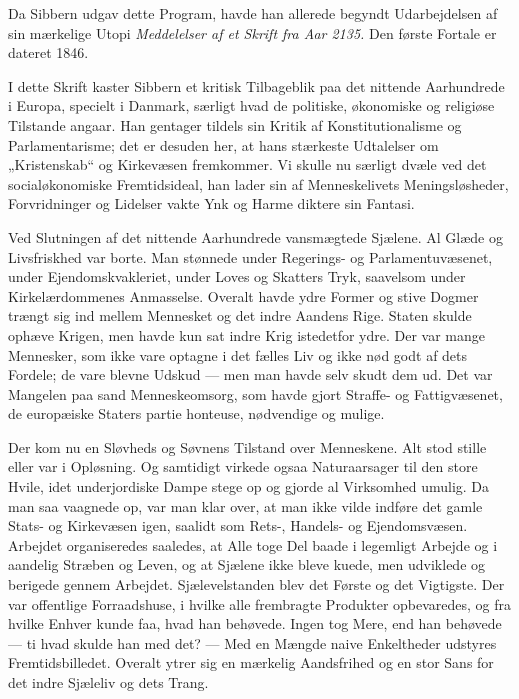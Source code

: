 \documentclass[12pt,a4paper,openany]{book}
\newcommand{\opage}[1]{\marginnote{\footnotesize\textit{[#1]}}}
\begin{document}
Da Sibbern udgav dette Program, havde han allerede begyndt Udarbejdelsen af sin
mærkelige Utopi \textit{Meddelelser af et Skrift fra Aar 2135.} Den første
Fortale er dateret 1846.

\setcounter{footnote}{0}%
\opage{115}I dette Skrift kaster Sibbern et kritisk Tilbageblik paa det
nittende Aarhundrede i Europa, specielt i Danmark, særligt hvad de politiske,
økonomiske og religiøse Tilstande angaar. Han gentager tildels sin Kritik af
Konstitutionalisme og Parlamentarisme; det er desuden her, at hans stærkeste
Udtalelser om „Kristenskab“ og Kirkevæsen fremkommer. Vi skulle nu særligt
dvæle ved det socialøkonomiske Fremtidsideal, han lader sin af Menneskelivets
Meningsløsheder, Forvridninger og Lidelser vakte Ynk og Harme diktere sin Fantasi.

Ved Slutningen af det nittende Aarhundrede vansmægtede Sjælene. Al Glæde og
Livsfriskhed var borte. Man stønnede under Regerings- og Parlamentuvæsenet,
under Ejendomskvakleriet, under Loves og Skatters Tryk, saavelsom under
Kirkelærdommenes Anmasselse. Overalt havde ydre Former og stive Dogmer trængt
sig ind mellem Mennesket og det indre Aandens Rige. Staten skulde ophæve
Krigen, men havde kun sat indre Krig istedetfor ydre. Der var mange Mennesker,
som ikke vare optagne i det fælles Liv og ikke nød godt af dets Fordele; de
vare blevne Udskud --- men man havde selv skudt dem ud. Det var Mangelen paa
sand Menneskeomsorg, som havde gjort Straffe- og Fattigvæsenet, de europæiske
Staters partie honteuse, nødvendige og mulige.

Der kom nu en Sløvheds og Søvnens Tilstand over Menneskene. Alt stod stille
eller var i Opløsning. Og samtidigt virkede ogsaa Naturaarsager til den store
Hvile, idet underjordiske Dampe stege op og gjorde al Virksomhed umulig. Da man
saa vaagnede op, var man klar over, at man ikke vilde indføre det gamle Stats-
og Kirkevæsen igen, saalidt som Rets-, Handels- og Ejendomsvæsen. Arbejdet
organiseredes saaledes, at Alle toge Del baade i legemligt Arbejde og i
aandelig Stræben og Leven, og at Sjælene ikke bleve kuede, men udviklede og
berigede gennem Arbejdet. Sjælevelstanden blev det Første og det Vigtigste. Der
var offentlige Forraadshuse, i hvilke alle frembragte Produkter opbevaredes, og
fra hvilke Enhver kunde faa, hvad han behøvede. Ingen tog Mere, end han
behøvede --- ti hvad skulde han med det? ---
\setcounter{footnote}{0}%
\opage{116}Med en Mængde naive Enkeltheder udstyres Fremtidsbilledet. Overalt
ytrer sig en mærkelig Aandsfrihed og en stor Sans for det indre Sjæleliv og
dets Trang.
\end{document}

